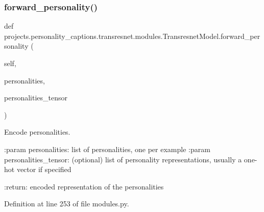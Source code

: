\subsubsection{\texorpdfstring{forward\+\_\+personality()}{forward\_personality()}}
{\footnotesize\ttfamily def projects.\+personality\+\_\+captions.\+transresnet.\+modules.\+Transresnet\+Model.\+forward\+\_\+personality (\begin{DoxyParamCaption}\item[{}]{self,  }\item[{}]{personalities,  }\item[{}]{personalities\+\_\+tensor }\end{DoxyParamCaption})}

\begin{DoxyVerb}Encode personalities.

:param personalities:
    list of personalities, one per example
:param personalities_tensor:
    (optional) list of personality representations, usually a one-hot
    vector if specified

:return:
    encoded representation of the personalities
\end{DoxyVerb}
 

Definition at line 253 of file modules.\+py.



